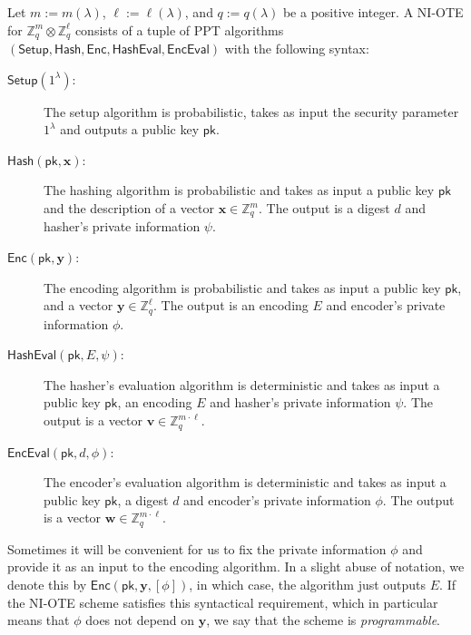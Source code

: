 \documentclass{article}
\newcommand{\Z}{\mathbb{Z}}
\renewcommand{\sec}{\ensuremath{\lambda}}
\newcommand{\algofont}[1]{\ensuremath{\mathsf{#1}}}
\newcommand{\Enc}{{\algofont{Enc}}}
\newcommand{\Setup}{{\algofont{Setup}}}
\newcommand{\Eval}{\algofont{Eval}\xspace}
\newcommand{\Hash}{{\algofont{Hash}}}
\newcommand{\pk}{{\mathsf{pk}}}
\newcommand\bbbone{1}
\begin{document}
\begin{definition}
Let $m:=m(\sec)$, $\ell:=\ell(\sec)$, and  $q:=q(\sec)$ be a positive integer. A NI-OTE for $\Z_q^m\otimes\Z_q^\ell$ consists of a tuple of PPT algorithms $(\Setup, \Hash, \Enc, \Hash\Eval, \Enc\Eval)$ with the following syntax:
\begin{description}
    \item[$\Setup(\bbbone^\sec)$:] The setup algorithm is probabilistic, takes as input the security parameter $\bbbone^\sec$ and outputs a public key $\pk$.
    
    \item[$\Hash(\pk, \mathbf{x})$:] The hashing algorithm is probabilistic and takes as input a public key $\pk$ and the description of a vector $\mathbf{x}\in\Z_q^{m}$. The output is a digest $d$ and hasher's private information $\psi$.
    \item[$\Enc(\pk, \mathbf{y})$:] The encoding algorithm is probabilistic and takes as input a public key $\pk$, and a vector $\mathbf{y}\in\Z_q^{\ell}$. The output is an encoding $E$ and encoder's private information $\phi$. 
    \item[$\Hash\Eval(\pk, E, \psi)$:] The hasher's evaluation algorithm is deterministic and takes as input a public key $\pk$, an encoding $E$ and hasher's private information $\psi$. The output is a vector $\mathbf{v}\in\Z_q^{m\cdot \ell}$.
    \item[$\Enc\Eval(\pk, d, \phi)$:] The encoder's evaluation algorithm is deterministic and takes as input a public key $\pk$, a digest $d$ and encoder's private information $\phi$. The output is a vector $\mathbf{w}\in\Z_q^{m\cdot \ell}$.
\end{description}
\end{definition}
%
Sometimes it will be convenient for us to fix the private information $\phi$ and provide it as an input to the encoding algorithm. In a slight abuse of notation, we denote this by 
$\Enc(\pk, \mathbf{y}, {[\phi]})$, in which case, the algorithm just outputs $E$. If the NI-OTE scheme satisfies this syntactical requirement, which in particular means that $\phi$ does not depend on $\mathbf{y}$, we say that the scheme is \emph{programmable}.
\end{document}
